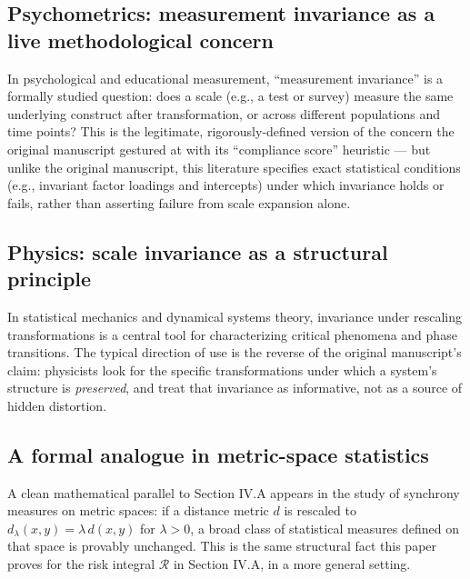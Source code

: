 \documentclass[10pt,journal,compsoc]{IEEEtran}
\begin{document}
\subsection{Psychometrics: measurement invariance as a live methodological concern}
In psychological and educational measurement, ``measurement invariance'' is a formally studied question: does a scale (e.g., a test or survey) measure the same underlying construct after transformation, or across different populations and time points? This is the legitimate, rigorously-defined version of the concern the original manuscript gestured at with its ``compliance score'' heuristic — but unlike the original manuscript, this literature specifies exact statistical conditions (e.g., invariant factor loadings and intercepts) under which invariance holds or fails, rather than asserting failure from scale expansion alone.

\subsection{Physics: scale invariance as a structural principle}
In statistical mechanics and dynamical systems theory, invariance under rescaling transformations is a central tool for characterizing critical phenomena and phase transitions. The typical direction of use is the reverse of the original manuscript's claim: physicists look for the specific transformations under which a system's structure is \emph{preserved}, and treat that invariance as informative, not as a source of hidden distortion.

\subsection{A formal analogue in metric-space statistics}
A clean mathematical parallel to Section IV.A appears in the study of synchrony measures on metric spaces: if a distance metric $d$ is rescaled to $d_\lambda(x,y) = \lambda\, d(x,y)$ for $\lambda>0$, a broad class of statistical measures defined on that space is provably unchanged. This is the same structural fact this paper proves for the risk integral $\mathcal{R}$ in Section IV.A, in a more general setting.
\end{document}
